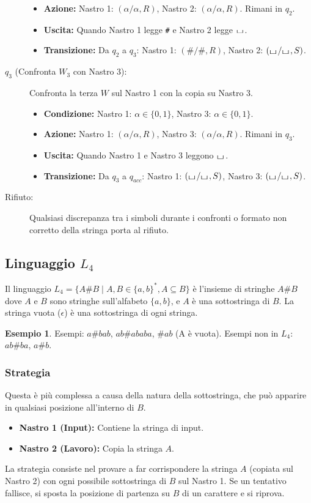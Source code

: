 \documentclass[a4paper]{article}
\theoremstyle{definition} %
\newtheorem{example}{Esempio}
\newcommand{\blankS}{\ensuremath{\raisebox{-0.15ex}{\scalebox{1.3}[0.7]{$\sqcup$}}\mkern2mu}}
\begin{document}
\begin{description}
\begin{itemize}
        \item \textbf{Azione:} Nastro 1: $(\alpha/\alpha, R)$, Nastro 2: $(\alpha/\alpha, R)$. Rimani in $q_2$.
        \item \textbf{Uscita:} Quando Nastro 1 legge \texttt{\#} e Nastro 2 legge $\blankS$.
        \item \textbf{Transizione:} Da $q_2$ a $q_3$: Nastro 1: $(\#/\#, R)$, Nastro 2: $(\blankS/\blankS, S)$.
    \end{itemize}
    \item[$q_3$ (Confronta $W_3$ con Nastro 3):] Confronta la terza $W$ sul Nastro 1 con la copia su Nastro 3.
    \begin{itemize}
        \item \textbf{Condizione:} Nastro 1: $\alpha \in \{0,1\}$, Nastro 3: $\alpha \in \{0,1\}$.
        \item \textbf{Azione:} Nastro 1: $(\alpha/\alpha, R)$, Nastro 3: $(\alpha/\alpha, R)$. Rimani in $q_3$.
        \item \textbf{Uscita:} Quando Nastro 1 e Nastro 3 leggono $\blankS$.
        \item \textbf{Transizione:} Da $q_3$ a $q_{acc}$: Nastro 1: $(\blankS/\blankS, S)$, Nastro 3: $(\blankS/\blankS, S)$.
    \end{itemize}
    \item[Rifiuto:] Qualsiasi discrepanza tra i simboli durante i confronti o formato non corretto della stringa porta al rifiuto.
\end{description}

\subsection{Linguaggio $L_4$}
Il linguaggio $L_4 = \{A\#B \mid A,B \in \{a,b\}^*, A \subseteq B \}$ è l'insieme di stringhe $A\#B$ dove $A$ e $B$ sono stringhe sull'alfabeto $\{a,b\}$, e $A$ è una sottostringa di $B$. La stringa vuota ($\epsilon$) è una sottostringa di ogni stringa.
\begin{example}
Esempi: $a\#bab$, $ab\#ababa$, $\#ab$ (A è vuota).
Esempi non in $L_4$: $ab\#ba$, $a\#b$.
\end{example}

\subsubsection{Strategia}
Questa è più complessa a causa della natura della sottostringa, che può apparire in qualsiasi posizione all'interno di $B$.
\begin{itemize}
    \item \textbf{Nastro 1 (Input):} Contiene la stringa di input.
    \item \textbf{Nastro 2 (Lavoro):} Copia la stringa $A$.
\end{itemize}
La strategia consiste nel provare a far corrispondere la stringa $A$ (copiata sul Nastro 2) con ogni possibile sottostringa di $B$ sul Nastro 1. Se un tentativo fallisce, si sposta la posizione di partenza su $B$ di un carattere e si riprova.
\end{document}
